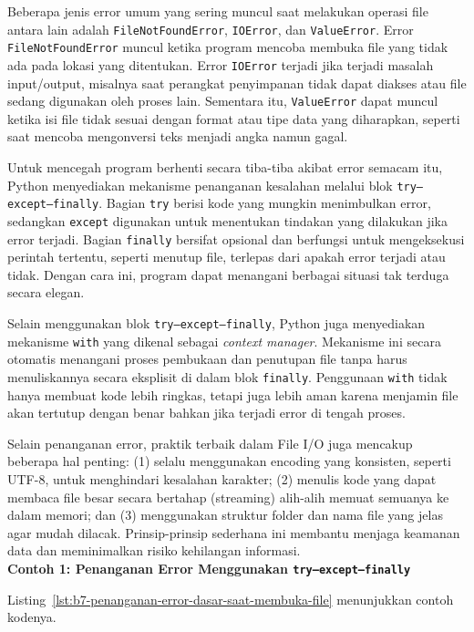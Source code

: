 Beberapa jenis error umum yang sering muncul saat melakukan operasi file antara lain adalah \texttt{FileNotFoundError}, \texttt{IOError}, dan \texttt{ValueError}.  
Error \texttt{FileNotFoundError} muncul ketika program mencoba membuka file yang tidak ada pada lokasi yang ditentukan. Error \texttt{IOError} terjadi jika terjadi masalah input/output, misalnya saat perangkat penyimpanan tidak dapat diakses atau file sedang digunakan oleh proses lain. Sementara itu, \texttt{ValueError} dapat muncul ketika isi file tidak sesuai dengan format atau tipe data yang diharapkan, seperti saat mencoba mengonversi teks menjadi angka namun gagal.

Untuk mencegah program berhenti secara tiba-tiba akibat error semacam itu, Python menyediakan mekanisme penanganan kesalahan melalui blok \texttt{try--except--finally}.  
Bagian \texttt{try} berisi kode yang mungkin menimbulkan error, sedangkan \texttt{except} digunakan untuk menentukan tindakan yang dilakukan jika error terjadi.  
Bagian \texttt{finally} bersifat opsional dan berfungsi untuk mengeksekusi perintah tertentu, seperti menutup file, terlepas dari apakah error terjadi atau tidak.  
Dengan cara ini, program dapat menangani berbagai situasi tak terduga secara elegan.

Selain menggunakan blok \texttt{try--except--finally}, Python juga menyediakan mekanisme \texttt{with} yang dikenal sebagai \textit{context manager}.  
Mekanisme ini secara otomatis menangani proses pembukaan dan penutupan file tanpa harus menuliskannya secara eksplisit di dalam blok \texttt{finally}.  
Penggunaan \texttt{with} tidak hanya membuat kode lebih ringkas, tetapi juga lebih aman karena menjamin file akan tertutup dengan benar bahkan jika terjadi error di tengah proses.

Selain penanganan error, praktik terbaik dalam File I/O juga mencakup beberapa hal penting:  
(1) selalu menggunakan encoding yang konsisten, seperti UTF-8, untuk menghindari kesalahan karakter;  
(2) menulis kode yang dapat membaca file besar secara bertahap (streaming) alih-alih memuat semuanya ke dalam memori;  
dan (3) menggunakan struktur folder dan nama file yang jelas agar mudah dilacak.  
Prinsip-prinsip sederhana ini membantu menjaga keamanan data dan meminimalkan risiko kehilangan informasi.\\

\noindent\textbf{Contoh 1: Penanganan Error Menggunakan \texttt{try--except--finally}}

Listing~\ref{lst:b7-penanganan-error-dasar-saat-membuka-file} menunjukkan contoh kodenya.

